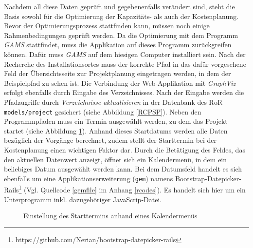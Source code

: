 \documentclass[a4paper,12pt,parskip,bibtotoc,liststotoc]{article}
\begin{document}
Nachdem all diese Daten geprüft und gegebenenfalls verändert sind, steht die Basis sowohl für die Optimierung der Kapazitäts- als auch der Kostenplanung. Bevor der Optimierungsprozess stattfinden kann, müssen noch einige Rahmenbedingungen geprüft werden. Da die Optimierung mit dem Programm \textit{GAMS} stattfindet, muss die Applikation auf dieses Programm zurückgreifen können. Dafür muss \textit{GAMS} auf dem hiesigen Computer installiert sein. Nach der Recherche des Installationsortes muss der korrekte Pfad in das dafür vorgesehene Feld der Übersichtsseite zur Projektplanung eingetragen werden, in dem der Beispielpfad zu sehen ist. Die Verbindung der Web-Applikation mit \textit{GraphViz} erfolgt ebenfalls durch Eingabe des Verzeichnisses. Nach der Eingabe werden die Pfadzugriffe durch \textit{Verzeichnisse aktualisieren} in der Datenbank des RoR \texttt{models/project} gesichert (siehe Abbildung \ref{RCPSP}). Neben den Programmpfaden muss ein Termin ausgewählt werden, zu dem das Projekt startet (siehe Abbildung \ref{Startdatum}). Anhand dieses Startdatums werden alle Daten bezüglich der Vorgänge berechnet, zudem stellt der Starttermin bei der Kostenplanung einen wichtigen Faktor dar. Durch die Betätigung des Feldes, das den aktuellen Datenwert anzeigt, öffnet sich ein Kalendermenü, in dem ein beliebiges Datum ausgewählt werden kann. Bei dem Datumsfeld handelt es sich ebenfalls um eine Applikationserweiterung (\texttt{gem}) namens \glqq Bootstrap-Datepicker-Rails\grqq\footnote{https://github.com/Nerian/bootstrap-datepicker-rails} (Vgl. Quellcode \ref{gemfile} im Anhang \ref{rcodes}). Es handelt sich hier um ein Unterprogramm inkl. dazugehöriger JavaScrip-Datei. \\

\begin{figure}[h!]
  \begin{center}
    \caption{Einstellung des Starttermins anhand eines Kalendermenüs}  \label{Startdatum}
  \end{center}
\end{figure}
\end{document}
